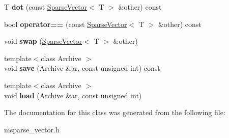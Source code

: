 \begin{DoxyCompactItemize}
\item 
\mbox{\label{classcpyp_1_1_sparse_vector_a90c9d4bca95c9bc4a5ee406800fc124b}} 
T {\bfseries dot} (const \mbox{\hyperlink{classcpyp_1_1_sparse_vector}{Sparse\+Vector}}$<$ T $>$ \&other) const
\item 
\mbox{\label{classcpyp_1_1_sparse_vector_ac35c07d95026e5585a056402b5f44739}} 
bool {\bfseries operator==} (const \mbox{\hyperlink{classcpyp_1_1_sparse_vector}{Sparse\+Vector}}$<$ T $>$ \&other) const
\item 
\mbox{\label{classcpyp_1_1_sparse_vector_ab48e4e466ac30efb7859f5f5c1bffb1b}} 
void {\bfseries swap} (\mbox{\hyperlink{classcpyp_1_1_sparse_vector}{Sparse\+Vector}}$<$ T $>$ \&other)
\item 
\mbox{\label{classcpyp_1_1_sparse_vector_a70497bd7e6b62ebf678fec01c394138f}} 
{\footnotesize template$<$class Archive $>$ }\\void {\bfseries save} (Archive \&ar, const unsigned int) const
\item 
\mbox{\label{classcpyp_1_1_sparse_vector_aec6d230f8d1bc68f17015623aafb6244}} 
{\footnotesize template$<$class Archive $>$ }\\void {\bfseries load} (Archive \&ar, const unsigned int)
\end{DoxyCompactItemize}


The documentation for this class was generated from the following file\+:\begin{DoxyCompactItemize}
\item 
msparse\+\_\+vector.\+h\end{DoxyCompactItemize}
